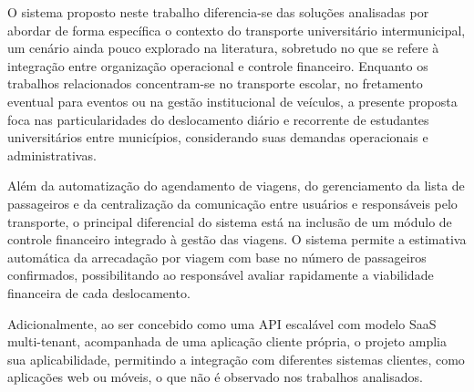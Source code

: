 O sistema proposto neste trabalho diferencia-se das soluções analisadas por abordar de forma específica o contexto do transporte universitário intermunicipal, um cenário ainda pouco explorado na literatura, sobretudo no que se refere à integração entre organização operacional e controle financeiro. Enquanto os trabalhos relacionados concentram-se no transporte escolar, no fretamento eventual para eventos ou na gestão institucional de veículos, a presente proposta foca nas particularidades do deslocamento diário e recorrente de estudantes universitários entre municípios, considerando suas demandas operacionais e administrativas.

Além da automatização do agendamento de viagens, do gerenciamento da lista de passageiros e da centralização da comunicação entre usuários e responsáveis pelo transporte, o principal diferencial do sistema está na inclusão de um módulo de controle financeiro integrado à gestão das viagens. O sistema permite a estimativa automática da arrecadação por viagem com base no número de passageiros confirmados, possibilitando ao responsável avaliar rapidamente a viabilidade financeira de cada deslocamento.

Adicionalmente, ao ser concebido como uma API escalável com modelo SaaS multi-tenant, acompanhada de uma aplicação cliente própria, o projeto amplia sua aplicabilidade, permitindo a integração com diferentes sistemas clientes, como aplicações web ou móveis, o que não é observado nos trabalhos analisados.
